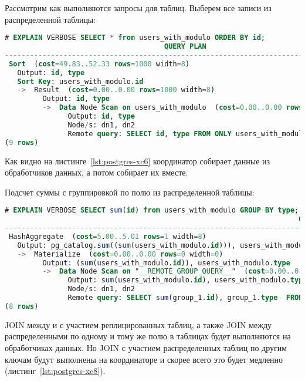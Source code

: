 Рассмотрим как выполняются запросы для таблиц. Выберем все записи из распределенной таблицы:

\begin{lstlisting}[language=SQL,label=lst:postgres-xc6,caption=Выборка записей из распределенной таблицы]
# EXPLAIN VERBOSE SELECT * from users_with_modulo ORDER BY id;
                                      QUERY PLAN
--------------------------------------------------------------------------------------
 Sort  (cost=49.83..52.33 rows=1000 width=8)
   Output: id, type
   Sort Key: users_with_modulo.id
   ->  Result  (cost=0.00..0.00 rows=1000 width=8)
         Output: id, type
         ->  Data Node Scan on users_with_modulo  (cost=0.00..0.00 rows=1000 width=8)
               Output: id, type
               Node/s: dn1, dn2
               Remote query: SELECT id, type FROM ONLY users_with_modulo WHERE true
(9 rows)
\end{lstlisting}

Как видно на листинге~\ref{lst:postgres-xc6} координатор собирает данные из обработчиков данных, а потом собирает их вместе.

Подсчет суммы с группировкой по полю из распределенной таблицы:

\begin{lstlisting}[language=SQL,label=lst:postgres-xc7,caption=Выборка записей из распределенной таблицы]
# EXPLAIN VERBOSE SELECT sum(id) from users_with_modulo GROUP BY type;
                                                                      QUERY PLAN
------------------------------------------------------------------------------------------------------------------------------------------------------
 HashAggregate  (cost=5.00..5.01 rows=1 width=8)
   Output: pg_catalog.sum((sum(users_with_modulo.id))), users_with_modulo.type
   ->  Materialize  (cost=0.00..0.00 rows=0 width=0)
         Output: (sum(users_with_modulo.id)), users_with_modulo.type
         ->  Data Node Scan on "__REMOTE_GROUP_QUERY__"  (cost=0.00..0.00 rows=1000 width=8)
               Output: sum(users_with_modulo.id), users_with_modulo.type
               Node/s: dn1, dn2
               Remote query: SELECT sum(group_1.id), group_1.type  FROM (SELECT id, type FROM ONLY users_with_modulo WHERE true) group_1 GROUP BY 2
(8 rows)
\end{lstlisting}

JOIN между и с участием реплицированных таблиц, а также JOIN между распределенными по одному и тому же полю в таблицах будет выполняются на обработчиках данных. Но JOIN с участием распределенных таблиц по другим ключам будут выполнены на координаторе и скорее всего это будет медленно (листинг~\ref{lst:postgres-xc8}).


